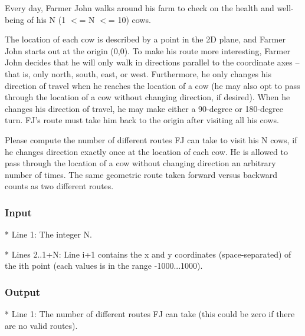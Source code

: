 

Every day, Farmer John walks around his farm to check on the health and well-being of his N (1 $<$= N $<$= 10) cows. 

The location of each cow is described by a point in the 2D plane, and Farmer John starts out at the origin (0,0).  To make his route more interesting, Farmer John decides that he will only walk in directions parallel to the coordinate axes -- that is, only north, south, east, or west.  Furthermore, he only changes his direction of travel when he reaches the location of a cow (he may also opt to pass through the location of a cow without changing direction, if desired).  When he changes his direction of travel, he may make either a 90-degree or 180-degree turn.  FJ's route must take him back to the origin after visiting all his cows.

Please compute the number of different routes FJ can take to visit his N cows, if he changes direction exactly once at the location of each cow.  He is allowed to pass through the location of a cow without changing direction an arbitrary number of times.  The same geometric route taken forward versus backward counts as two different routes. 

\subsubsection{Input}

* Line 1: The integer N.

* Lines 2..1+N: Line i+1 contains the x and y coordinates         (space-separated) of the ith point (each values is in the         range -1000...1000).

\subsubsection{Output}

* Line 1: The number of different routes FJ can take (this could be         zero if there are no valid routes).

